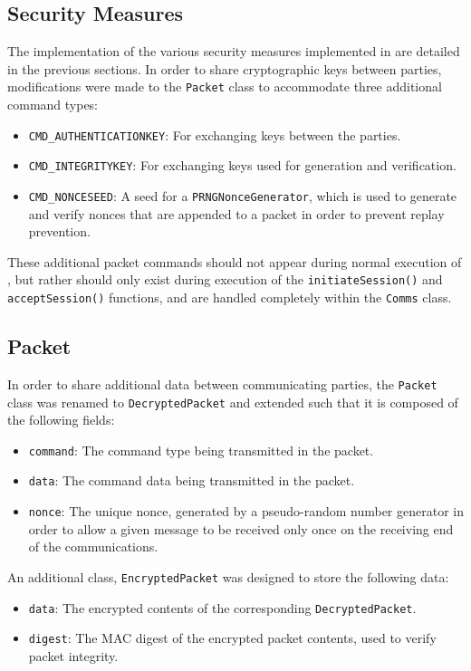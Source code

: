 \documentclass[a4paper,11pt]{article}
\begin{document}
\subsection{Security Measures}
The implementation of the various security measures implemented in
\packageName{} are detailed in the previous sections. In order to share
cryptographic keys between parties, modifications were made to the
\packageName{} \verb+Packet+ class to accommodate three additional command types:
\begin{itemize}
\item \verb+CMD_AUTHENTICATIONKEY+: For exchanging 
keys between the parties.
\item \verb+CMD_INTEGRITYKEY+: For exchanging  keys used for
 generation and
verification.
\item \verb+CMD_NONCESEED+: A seed for a \verb+PRNGNonceGenerator+,
which is used to generate and verify nonces that are appended to a packet in
order to prevent replay prevention.
\end{itemize}

These additional packet commands should not appear during normal execution of
\serviceName{}, but rather should only exist during execution of the
\verb+initiateSession()+ and \verb+acceptSession()+ functions, and are handled
completely within the \verb+Comms+ class.

\subsection{Packet}
In order to share additional data between communicating parties, the
\serviceName{} \verb+Packet+ class was renamed to \verb+DecryptedPacket+ and
extended such that it is composed of the following fields:
\begin{itemize}
\item \verb+command+: The command type being transmitted in the
packet.
\item \verb+data+: The command data being transmitted in the packet.
\item \verb+nonce+: The unique nonce, generated by a pseudo-random number
generator in order to allow a given message to be received only once on the
receiving end of the communications.
\end{itemize}

An additional class, \verb+EncryptedPacket+ was designed to store the following
data:
\begin{itemize}
\item \verb+data+: The encrypted contents of the corresponding
\verb+DecryptedPacket+.
\item \verb+digest+: The MAC digest of the encrypted packet contents, used to
verify packet integrity.
\end{itemize}
\end{document}
